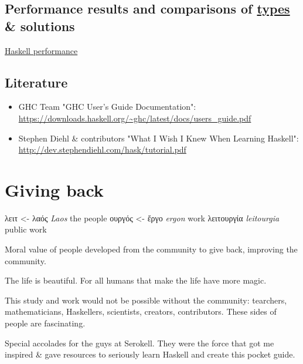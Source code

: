 \documentclass[a4paper,14pt,oneside]{book}
\begin{document}
\chapter{Performance results and comparisons of \hyperref[org27ebdf4]{types} \& solutions}
\label{sec:org904717d}
\href{https://github.com/haskell-perf}{Haskell performance}

\chapter{Literature}
\label{sec:org2d67c7c}

\begin{itemize}
\item GHC Team "GHC User’s Guide Documentation": \url{https://downloads.haskell.org/\~ghc/latest/docs/users\_guide.pdf}
\item Stephen Diehl \& contributors "What I Wish I Knew When Learning Haskell": \url{http://dev.stephendiehl.com/hask/tutorial.pdf}
\end{itemize}

\part{Giving back}
\label{sec:orge6f9099}

\textgreek{λειτ}       <- \textgreek{λαός}  \emph{Laos}       the people
    \textgreek{ουργός} <- \textgreek{ἔργο}  \emph{ergon}             work
\textgreek{λειτουργία}          \emph{leitourgia} public work

Moral value of people developed from the community to give back, improving the community.

The life is beautiful.
For all humans that make the life have more magic.

This study and work would not be possible without the community: tearchers, mathematicians, Haskellers, scientists, creators, contributors. These sides of people are fascinating.


Special accolades for the guys at Serokell. They were the force that got me inspired \& gave resources to seriously learn Haskell and create this pocket guide.
\end{document}

